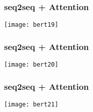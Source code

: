 \begin{frame}[fragile]\frametitle{seq2seq + Attention}





\begin{center}
\texttt{[image: bert19]}
\end{center}	

\end{frame}

\begin{frame}[fragile]\frametitle{seq2seq + Attention}





\begin{center}
\texttt{[image: bert20]}
\end{center}	

\end{frame}

\begin{frame}[fragile]\frametitle{seq2seq + Attention}





\begin{center}
\texttt{[image: bert21]}
\end{center}	

\end{frame}

